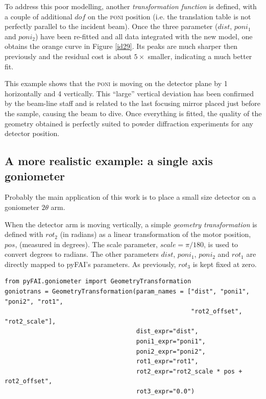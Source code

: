 \documentclass[preprint]{iucr}              %
\begin{document}
 
To address this poor modelling, another \textit{transformation function} is
defined, with a couple of additional $dof$ on the \textsc{poni} position
(i.e. the translation table is not perfectly parallel to the incident beam).
Once the three parameter ($dist$, $poni_1$ and $poni_2$) have been re-fitted and 
all data integrated with the new model, one obtains the orange
curve in Figure \ref{id29}. 
Its peaks are much sharper then previously and the residual cost is
about $5\times$ smaller, indicating a much better fit.

This example shows that the \textsc{poni} is moving on the detector
plane by 1 \textperthousand horizontally and 
4 \textperthousand vertically.
This ``large'' vertical deviation has been confirmed by the beam-line staff and
is related to the last focusing mirror placed just before the sample, causing the
beam to dive.
Once everything is fitted, the quality of the geometry obtained is perfectly
suited to powder diffraction experiments for any detector position.
  
\subsection{A more realistic example: a single axis goniometer}

Probably the main application of this work is to place a small size detector
on a goniometer $2\theta$ arm. 

When the detector arm is moving vertically, a simple \textit{geometry
transformation} is defined with $rot_2$ (in radians) as a
linear transformation of the motor position, $pos$, (measured in degrees).
The scale parameter, $scale = \pi / 180$, is used to convert degrees to radians.
The other parameters $dist$, $poni_1$, $poni_2$ and $rot_1$ are directly mapped
to pyFAI's parameters.
As previously, $rot_3$ is kept fixed at zero.

\begin{verbatim}
from pyFAI.goniometer import GeometryTransformation
goniotrans = GeometryTransformation(param_names = ["dist", "poni1", "poni2", "rot1",
                                                   "rot2_offset", "rot2_scale"],
                                    dist_expr="dist", 
                                    poni1_expr="poni1",
                                    poni2_expr="poni2", 
                                    rot1_expr="rot1", 
                                    rot2_expr="rot2_scale * pos + rot2_offset", 
                                    rot3_expr="0.0")
\end{verbatim}
\end{document}
